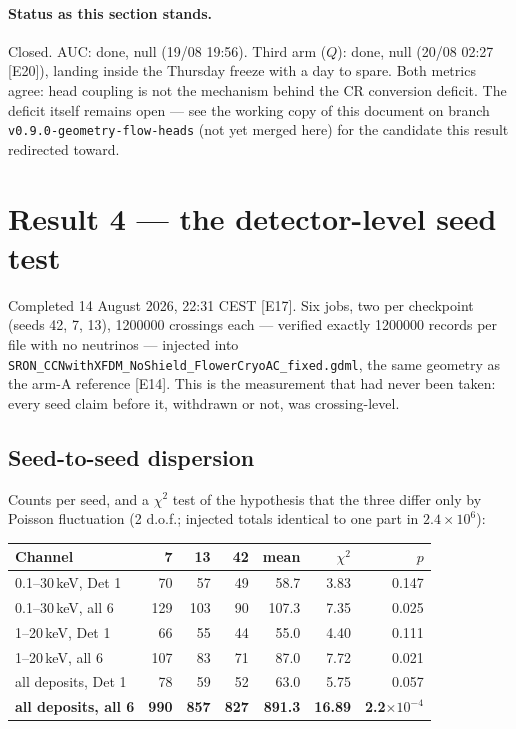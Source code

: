 \documentclass[11pt,a4paper]{article}
\newcommand{\ev}[1]{{\footnotesize\textcolor{prov}{[#1]}}}
\begin{document}
\paragraph{Status as this section stands.} Closed. AUC: done, null
(19/08 19:56). Third arm ($Q$): done, null (20/08 02:27 \ev{E20}), landing
inside the Thursday freeze with a day to spare. Both metrics agree: head
coupling is not the mechanism behind the CR conversion deficit. The deficit
itself remains open --- see the working copy of this document on branch
\texttt{v0.9.0-geometry-flow-heads} (not yet merged here) for the candidate
this result redirected toward.

\section{Result 4 --- the detector-level seed test}
\label{sec:inprogress}

Completed 14 August 2026, 22:31 CEST \ev{E17}. Six jobs, two per checkpoint
(seeds 42, 7, 13), \num{1200000} crossings each --- verified exactly
\num{1200000} records per file with no neutrinos --- injected into
\texttt{SRON\_CCNwithXFDM\_NoShield\_FlowerCryoAC\_fixed.gdml}, the same
geometry as the arm-A reference \ev{E14}. This is the measurement that had never
been taken: every seed claim before it, withdrawn or not, was crossing-level.

\subsection{Seed-to-seed dispersion}

Counts per seed, and a $\chi^2$ test of the hypothesis that the three differ
only by Poisson fluctuation (2 d.o.f.; injected totals identical to one part in
$2.4\times10^{6}$):

\begin{center}
\begin{tabular}{lrrrrrr}
\toprule
Channel & 7 & 13 & 42 & mean & $\chi^2$ & $p$ \\
\midrule
0.1--30\,keV, Det 1 &  70 &  57 &  49 &  58.7 &  3.83 & 0.147 \\
0.1--30\,keV, all 6 & 129 & 103 &  90 & 107.3 &  7.35 & 0.025 \\
1--20\,keV, Det 1   &  66 &  55 &  44 &  55.0 &  4.40 & 0.111 \\
1--20\,keV, all 6   & 107 &  83 &  71 &  87.0 &  7.72 & 0.021 \\
all deposits, Det 1 &  78 &  59 &  52 &  63.0 &  5.75 & 0.057 \\
\textbf{all deposits, all 6} & \textbf{990} & \textbf{857} & \textbf{827}
                    & \textbf{891.3} & \textbf{16.89} & \textbf{2.2$\times10^{-4}$} \\
\bottomrule
\end{tabular}
\end{center}
\end{document}
